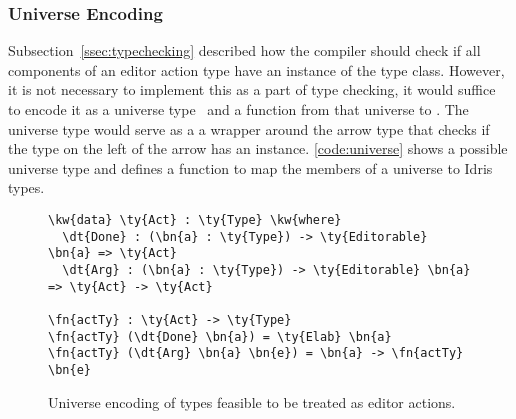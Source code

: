 


\subsubsection{Universe Encoding}
\label{sssec:universeEncoding}

Subsection~\ref{ssec:typechecking} described how the compiler should check if all
components of an editor action type have an instance of the \Editorable{} type
class. However, it is not necessary to implement this as a part of type checking,
it would suffice to encode it as a universe type~\cite{genericDep} and a
function from that universe to .
The universe type would serve as a a wrapper around the arrow type that checks
if the type on the left of the arrow has an \Editorable{} instance.
\autoref{code:universe} shows a possible universe type and
defines a function to map the members of a universe to Idris types.

\begin{figure}[H]
\begin{Verbatim}
\kw{data} \ty{Act} : \ty{Type} \kw{where}
  \dt{Done} : (\bn{a} : \ty{Type}) -> \ty{Editorable} \bn{a} => \ty{Act}
  \dt{Arg} : (\bn{a} : \ty{Type}) -> \ty{Editorable} \bn{a} => \ty{Act} -> \ty{Act}

\fn{actTy} : \ty{Act} -> \ty{Type}
\fn{actTy} (\dt{Done} \bn{a}) = \ty{Elab} \bn{a}
\fn{actTy} (\dt{Arg} \bn{a} \bn{e}) = \bn{a} -> \fn{actTy} \bn{e}
\end{Verbatim}
\caption{Universe encoding of types feasible to be treated as editor actions.}
\label{code:universe}
\end{figure}

